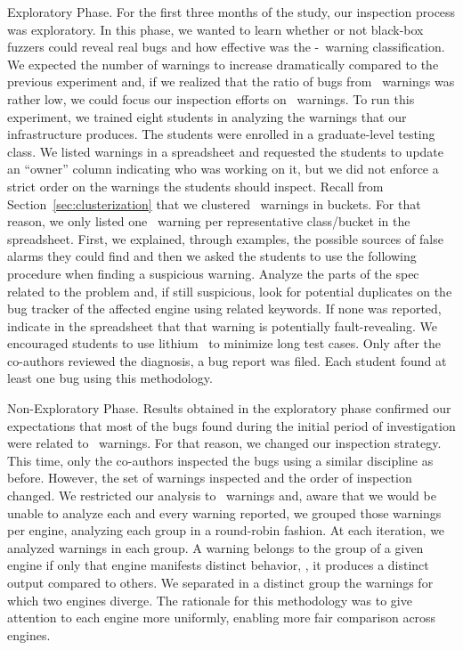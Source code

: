 \documentclass[sigconf,review, anonymous]{acmart}
\begin{document}
\vspace{0.5ex}
\lbrack{}Exploratory Phase.\rbrack{} For the first three months of the
study, our inspection process was exploratory.  In this phase, we
wanted to learn whether or not black-box fuzzers could reveal real
bugs and how effective was the \hi{}-\lo\ warning classification.  We
expected the number of warnings to increase dramatically compared to
the previous experiment and, if we realized that the ratio of bugs
from \lo\ warnings was rather low, we could focus our inspection
efforts on \hi\ warnings. To run this experiment, we trained eight
students in analyzing the warnings that our infrastructure
produces. The students were enrolled in a graduate-level testing
class. We listed warnings in a spreadsheet and requested the students
to update an ``owner'' column indicating who was working on it, but we
did not enforce a strict order on the warnings the students should
inspect. Recall from Section~\ref{sec:clusterization} that we
clustered \lo\ warnings in buckets. For that reason, we only listed
one \lo\ warning per representative class/bucket in the
spreadsheet. First, we explained, through examples, the possible
sources of false alarms they could find and then we asked the students
to use the following procedure when finding a suspicious
warning. Analyze the parts of the spec related to the problem and, if
still suspicious, look for potential duplicates on the bug tracker of
the affected engine using related keywords. If none was reported,
indicate in the spreadsheet that that warning is potentially
fault-revealing. We encouraged students to use lithium~\cite{lithium}
to minimize long test cases. Only after the co-authors reviewed the
diagnosis, a bug report was filed. Each student found at least one bug
using this methodology.

\vspace{0.5ex}
\lbrack{}Non-Exploratory Phase.\rbrack{} Results obtained in the
exploratory phase confirmed our expectations that most of the bugs
found during the initial period of investigation were related to
\hi\ warnings. For that reason, we changed our inspection
strategy. This time, only the co-authors inspected the bugs using a
similar discipline as before. However, the set of warnings inspected
and the order of inspection changed. We restricted our analysis to
\hi\ warnings and, aware that we would be unable to analyze each and
every warning reported, we grouped those warnings per engine,
analyzing each group in a round-robin fashion.  At each iteration, we
analyzed \warningsIteration{} warnings in each group. A warning
belongs to the group of a given engine if only that engine manifests
distinct behavior, \ie{}, it produces a distinct output compared to
others. We separated in a distinct group the warnings for which two
engines diverge. The rationale for this methodology was to give
attention to each engine more uniformly, enabling more fair comparison
across engines.
\end{document}
